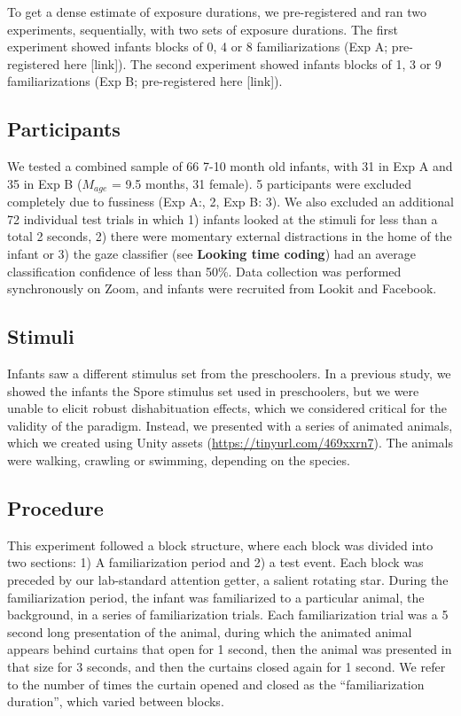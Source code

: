 \documentclass[10pt, letterpaper]{article}
\begin{document}
To get a dense estimate of exposure durations, we pre-registered and ran
two experiments, sequentially, with two sets of exposure durations. The
first experiment showed infants blocks of 0, 4 or 8 familiarizations
(Exp A; pre-registered here {[}link{]}). The second experiment showed
infants blocks of 1, 3 or 9 familiarizations (Exp B; pre-registered here
{[}link{]}).

\hypertarget{participants-1}{%
\subsection{Participants}\label{participants-1}}

We tested a combined sample of 66 7-10 month old infants, with 31 in Exp
A and 35 in Exp B (\(M_{age}\) = 9.5 months, 31 female). 5 participants
were excluded completely due to fussiness (Exp A:, 2, Exp B: 3). We also
excluded an additional 72 individual test trials in which 1) infants
looked at the stimuli for less than a total 2 seconds, 2) there were
momentary external distractions in the home of the infant or 3) the gaze
classifier (see \textbf{Looking time coding}) had an average
classification confidence of less than 50\%. Data collection was
performed synchronously on Zoom, and infants were recruited from Lookit
and Facebook.

\hypertarget{stimuli-1}{%
\subsection{Stimuli}\label{stimuli-1}}

Infants saw a different stimulus set from the preschoolers. In a
previous study, we showed the infants the Spore stimulus set used in
preschoolers, but we were unable to elicit robust dishabituation
effects, which we considered critical for the validity of the paradigm.
Instead, we presented with a series of animated animals, which we
created using Unity assets (\url{https://tinyurl.com/469xxrn7}). The
animals were walking, crawling or swimming, depending on the species.

\hypertarget{procedure-1}{%
\subsection{Procedure}\label{procedure-1}}

This experiment followed a block structure, where each block was divided
into two sections: 1) A familiarization period and 2) a test event. Each
block was preceded by our lab-standard attention getter, a salient
rotating star. During the familiarization period, the infant was
familiarized to a particular animal, the background, in a series of
familiarization trials. Each familiarization trial was a 5 second long
presentation of the animal, during which the animated animal appears
behind curtains that open for 1 second, then the animal was presented in
that size for 3 seconds, and then the curtains closed again for 1
second. We refer to the number of times the curtain opened and closed as
the ``familiarization duration'', which varied between blocks.
\end{document}
